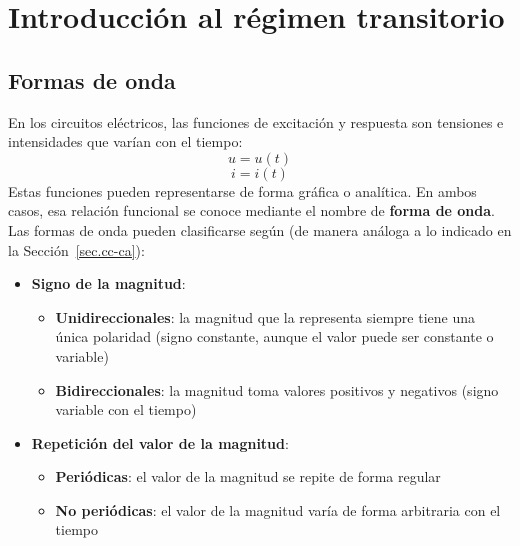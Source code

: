 \documentclass[11pt]{book} %
\begin{document}



	
	
	\chapter{Introducción al régimen transitorio}
	
	

	
	
	\section{Formas de onda}
	
	En los circuitos eléctricos, las funciones de excitación y respuesta son tensiones
	e intensidades que varían con el tiempo:
	\begin{equation*}
		u=u(t)
	\end{equation*}
	\begin{equation*}
		i=i(t)
	\end{equation*}
	Estas funciones pueden representarse de forma gráfica o analítica. En ambos
	casos, esa relación funcional se conoce mediante el nombre de \textbf{forma de onda}. Las formas de onda pueden clasificarse según (de manera análoga a lo indicado en la Sección~\ref{sec.cc-ca}):
	\begin{itemize}
		\item \textbf{Signo de la magnitud}:
		\begin{itemize}
			\item \textbf{Unidireccionales}: la magnitud que la representa siempre tiene una única polaridad (signo constante, aunque el valor puede ser constante o variable)
			\item \textbf{Bidireccionales}: la magnitud toma valores positivos y negativos (signo variable con el tiempo)
		\end{itemize}
		\item \textbf{Repetición del valor de la magnitud}:
		\begin{itemize}
			\item \textbf{Periódicas}: el valor de la magnitud se repite de forma regular
			\item \textbf{No periódicas}: el valor de la magnitud varía de forma arbitraria con el tiempo
		\end{itemize}
	\end{itemize}
	
\end{document}

